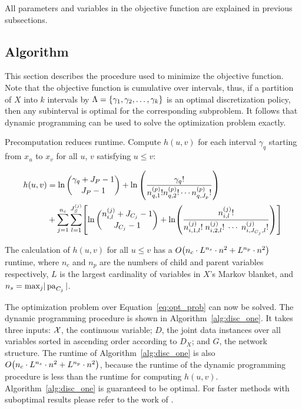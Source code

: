 All parameters and variables in the objective function are explained in previous subsections.

\subsection{Algorithm}
\label{subsec:algo}

This section describes the procedure used to minimize the objective function.
Note that the objective function is cumulative over intervals, thus, if a partition of $X$ into $k$ intervals by $\Lambda = \curly{\gamma_1 , \gamma_2  , \ldots , \gamma_k}$ is an optimal discretization policy, then any subinterval is optimal for the corresponding subproblem.
It follows that dynamic programming can be used to solve the optimization problem exactly.

Precomputation reduces runtime.
Compute $h(u,v)$ for each interval $\gamma_q$ starting from $x_{u}$ to $x_{v}$ for all $u$, $v$ satisfying $u \leq v$:

\begin{small}
  \begin{equation}
  \label{eqn:h_function}
  \begin{aligned}
  h(u,v) &=  \ln {{\gamma_{q} + J_P - 1}\choose{J_P-1}} + \ln \left( { {{\gamma_q}!}\over{ {n^{(p)}_{q,1} !} {n^{(p)}_{q,2} !} \cdots {n^{(p)}_{q,J_p} !}} } \right) \\
  & + \sum_{j=1}^{n_c} \sum_{l=1}^{J^{(j)}_S} \brock{
    { \ln
            {{n^{(j)}_{i,l} + J_{C_j} - 1}\choose{J_{C_j}-1}}}
      +
      \ln \paren{ {
            \frac{
              {n^{(j)}_{i,l}}!
            }{
              {n^{(j)}_{i,1,l}!} \; {n^{(j)}_{i,2,l}!} \; \cdots \; {n^{(j)}_{i,J_{C_j},l}!}
            }
          }
          } }
  \end{aligned}
  \end{equation}
\end{small}

The calculation of $h(u,v)$ for all $u \leq v$ has a $\bigo \paren{ n_c \cdot {L}^{n_s} \cdot n^2 + {L}^{n_p} \cdot n^2 }$ runtime, where $n_c$ and $n_p$ are the numbers of child and parent variables respectively, $L$ is the largest cardinality of variables in $X$'s Markov blanket, and $n_s = \text{max}_j  |\operatorname{pa}_{C_j}|$.

The optimization problem over Equation~\ref{eq:opt_prob} can now be solved.
The dynamic programming procedure is shown in Algorithm~\ref{alg:disc_one}.
It takes three inputs: $\mathcal{X}$, the continuous variable; $D$, the joint data instances over all variables sorted in ascending order according to $D_X$; and $G$, the network structure.
The runtime of Algorithm~\ref{alg:disc_one} is also $\bigo \paren{ n_c \cdot {L}^{n_s} \cdot n^2 + {L}^{n_p} \cdot n^2 }$, because the runtime of the dynamic programming procedure is less than the runtime for computing $h(u,v)$.
Algorithm~\ref{alg:disc_one} is guaranteed to be optimal.
For faster methods with suboptimal results please refer to the work of \cite{Boulle_2006}.

